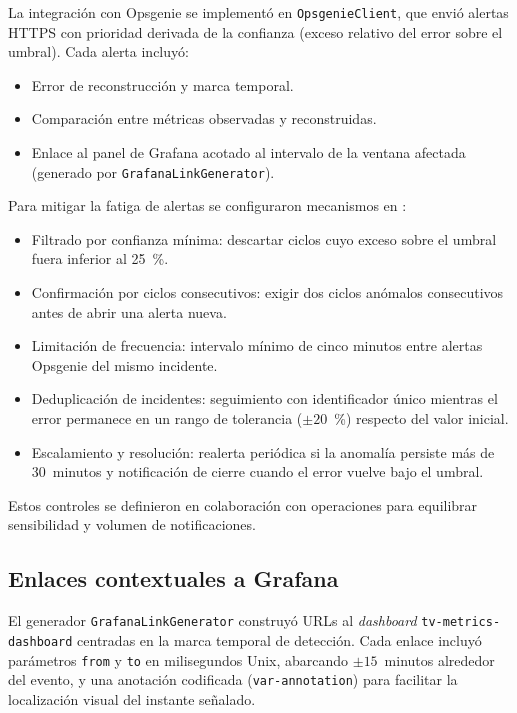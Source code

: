 La integración con Opsgenie se implementó en \texttt{OpsgenieClient}, que envió alertas HTTPS con prioridad derivada de la confianza (exceso relativo del error sobre el umbral). Cada alerta incluyó:

\begin{itemize}
\item Error de reconstrucción y marca temporal.
\item Comparación entre métricas observadas y reconstruidas.
\item Enlace al panel de Grafana acotado al intervalo de la ventana afectada (generado por \texttt{GrafanaLinkGenerator}).
\end{itemize}

Para mitigar la fatiga de alertas se configuraron mecanismos en :

\begin{itemize}
\item Filtrado por confianza mínima: descartar ciclos cuyo exceso sobre el umbral fuera inferior al 25~\%.
\item Confirmación por ciclos consecutivos: exigir dos ciclos anómalos consecutivos antes de abrir una alerta nueva.
\item Limitación de frecuencia: intervalo mínimo de cinco minutos entre alertas Opsgenie del mismo incidente.
\item Deduplicación de incidentes: seguimiento con identificador único mientras el error permanece en un rango de tolerancia ($\pm 20$~\%) respecto del valor inicial.
\item Escalamiento y resolución: realerta periódica si la anomalía persiste más de 30~minutos y notificación de cierre cuando el error vuelve bajo el umbral.
\end{itemize}

Estos controles se definieron en colaboración con operaciones para equilibrar sensibilidad y volumen de notificaciones.

\subsection{Enlaces contextuales a Grafana}

El generador \texttt{GrafanaLinkGenerator} construyó URLs al \textit{dashboard} \texttt{tv-metrics-dashboard} centradas en la marca temporal de detección. Cada enlace incluyó parámetros \texttt{from} y \texttt{to} en milisegundos Unix, abarcando $\pm 15$~minutos alrededor del evento, y una anotación codificada (\texttt{var-annotation}) para facilitar la localización visual del instante señalado.

